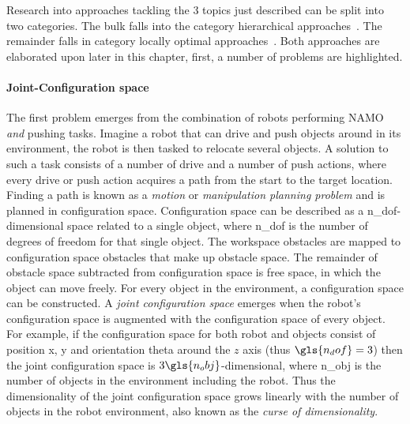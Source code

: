 Research into approaches tackling the 3 topics just described can be split into two categories. The bulk falls into the category hierarchical approaches~\cite{ellis_navigation_2022,krontiris_dealing_2015,scholz_navigation_2016,vega-brown_asymptotically_2020,wang_affordancebased_2020}. The remainder falls in category locally optimal approaches~\cite{novin_dynamic_2018,sabbaghnovin_optimal_2016,sabbaghnovin_model_2021}. Both approaches are elaborated upon later in this chapter, first, a number of problems are highlighted.\bs

\paragraph{Joint-Configuration space}
The first problem emerges from the combination of robots performing \ac{NAMO} \textit{and} pushing tasks. Imagine a robot that can drive and push objects around in its environment, the robot is then tasked to relocate several objects. A solution to such a task consists of a number of drive and a number of push actions, where every drive or push action acquires a path from the start to the target location. Finding a path is known as a \textit{motion} or \textit{manipulation planning problem} and is planned in configuration space. Configuration space can be described as a \gls{n_dof}-dimensional space related to a single object, where \gls{n_dof} is the number of degrees of freedom for that single object. The workspace obstacles are mapped to configuration space obstacles that make up obstacle space. The remainder of obstacle space subtracted from configuration space is free space, in which the object can move freely. For every object in the environment, a configuration space can be constructed. A \textit{joint configuration space} emerges when the robot's configuration space is augmented with the configuration space of every object. For example, if the configuration space for both robot and objects consist of position \gls{x}, \gls{y} and orientation \gls{theta} around the $z$ axis (thus $\gls{n_dof}=3$) then the joint configuration space is $3\gls{n_obj}$-dimensional, where \gls{n_obj} is the number of objects in the environment including the robot. Thus the dimensionality of the joint configuration space grows linearly with the number of objects in the robot environment, also known as the \textit{curse of dimensionality}.\bs

